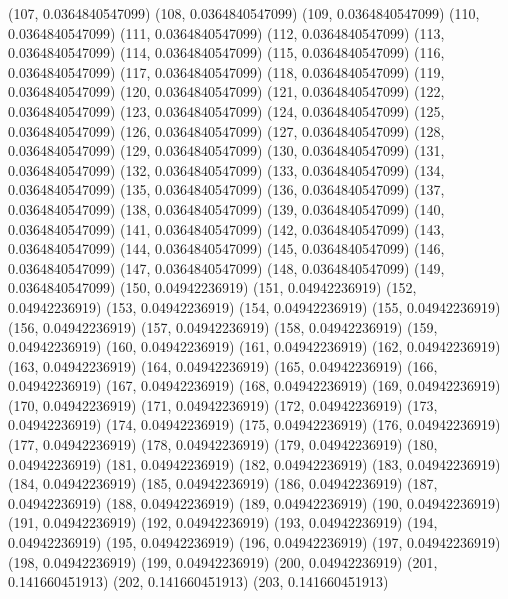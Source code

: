 {					(107, 0.0364840547099)
					(108, 0.0364840547099)
					(109, 0.0364840547099)
					(110, 0.0364840547099)
					(111, 0.0364840547099)
					(112, 0.0364840547099)
					(113, 0.0364840547099)
					(114, 0.0364840547099)
					(115, 0.0364840547099)
					(116, 0.0364840547099)
					(117, 0.0364840547099)
					(118, 0.0364840547099)
					(119, 0.0364840547099)
					(120, 0.0364840547099)
					(121, 0.0364840547099)
					(122, 0.0364840547099)
					(123, 0.0364840547099)
					(124, 0.0364840547099)
					(125, 0.0364840547099)
					(126, 0.0364840547099)
					(127, 0.0364840547099)
					(128, 0.0364840547099)
					(129, 0.0364840547099)
					(130, 0.0364840547099)
					(131, 0.0364840547099)
					(132, 0.0364840547099)
					(133, 0.0364840547099)
					(134, 0.0364840547099)
					(135, 0.0364840547099)
					(136, 0.0364840547099)
					(137, 0.0364840547099)
					(138, 0.0364840547099)
					(139, 0.0364840547099)
					(140, 0.0364840547099)
					(141, 0.0364840547099)
					(142, 0.0364840547099)
					(143, 0.0364840547099)
					(144, 0.0364840547099)
					(145, 0.0364840547099)
					(146, 0.0364840547099)
					(147, 0.0364840547099)
					(148, 0.0364840547099)
					(149, 0.0364840547099)
					(150, 0.04942236919)
					(151, 0.04942236919)
					(152, 0.04942236919)
					(153, 0.04942236919)
					(154, 0.04942236919)
					(155, 0.04942236919)
					(156, 0.04942236919)
					(157, 0.04942236919)
					(158, 0.04942236919)
					(159, 0.04942236919)
					(160, 0.04942236919)
					(161, 0.04942236919)
					(162, 0.04942236919)
					(163, 0.04942236919)
					(164, 0.04942236919)
					(165, 0.04942236919)
					(166, 0.04942236919)
					(167, 0.04942236919)
					(168, 0.04942236919)
					(169, 0.04942236919)
					(170, 0.04942236919)
					(171, 0.04942236919)
					(172, 0.04942236919)
					(173, 0.04942236919)
					(174, 0.04942236919)
					(175, 0.04942236919)
					(176, 0.04942236919)
					(177, 0.04942236919)
					(178, 0.04942236919)
					(179, 0.04942236919)
					(180, 0.04942236919)
					(181, 0.04942236919)
					(182, 0.04942236919)
					(183, 0.04942236919)
					(184, 0.04942236919)
					(185, 0.04942236919)
					(186, 0.04942236919)
					(187, 0.04942236919)
					(188, 0.04942236919)
					(189, 0.04942236919)
					(190, 0.04942236919)
					(191, 0.04942236919)
					(192, 0.04942236919)
					(193, 0.04942236919)
					(194, 0.04942236919)
					(195, 0.04942236919)
					(196, 0.04942236919)
					(197, 0.04942236919)
					(198, 0.04942236919)
					(199, 0.04942236919)
					(200, 0.04942236919)
					(201, 0.141660451913)
					(202, 0.141660451913)
					(203, 0.141660451913)
}
